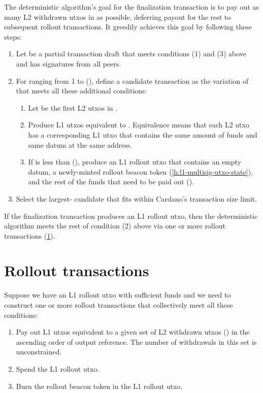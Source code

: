 \documentclass[../hydrozoa.tex]{subfiles}
\begin{document}
The deterministic algorithm's goal for the finalization transaction is to pay out as many L2 withdrawn utxos in  as possible, deferring payout for the rest to subsequent rollout transactions.
It greedily achieves this goal by following these steps:
\begin{enumerate}
  \item Let  be a partial transaction draft that meets conditions (1) and (3) above and has signatures from all peers.
  \item For  ranging from 1 to (), define a candidate transaction as the variation of  that meets all these additional conditions:
    \begin{enumerate}
      \item Let  be the first  L2 utxos in .
      \item Produce L1 utxos equivalent to .
        Equivalence means that each L2 utxo has a corresponding L1 utxo that contains the same amount of funds and same datum at the same address.
      \item If  is less than (), produce an L1 rollout utxo that contains an empty datum, a newly-minted rollout beacon token (\cref{h:l1-multisig-utxo-state}), and the rest of the funds that need to be paid out
        ().
    \end{enumerate}
  \item Select the largest- candidate that fits within Cardano's transaction size limit.
\end{enumerate}

If the finalization transaction produces an L1 rollout utxo, then the deterministic algorithm meets the rest of condition (2) above via one or more rollout transactions (\cref{h:deterministic-rollout-rollouts}).

\section{Rollout transactions}%
\label{h:deterministic-rollout-rollouts}%

Suppose we have an L1 rollout utxo with sufficient funds and we need to construct one or more rollout transactions that collectively meet all these conditions:
\begin{enumerate}
  \item Pay out L1 utxos equivalent to a given set of L2 withdrawn utxos () in the ascending order of output reference.
    The number of withdrawals in this set is unconstrained.
  \item Spend the L1 rollout utxo.
  \item Burn the rollout beacon token in the L1 rollout utxo.
\end{enumerate}
\end{document}
